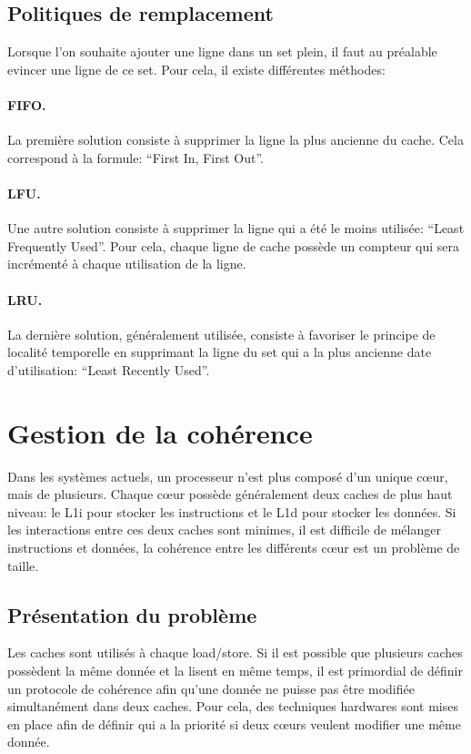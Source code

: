 \documentclass[a4paper]{article}
\begin{document}
\subsection{Politiques de remplacement}
\indent Lorsque l'on souhaite ajouter une ligne dans un set plein, il faut au préalable evincer une ligne de ce set. Pour cela, il existe différentes méthodes:

\paragraph{FIFO.} La première solution consiste à supprimer la ligne la plus ancienne du cache. Cela correspond à la formule: ``First In, First Out''.

\paragraph{LFU.} Une autre solution consiste à supprimer la ligne qui a été le moins utilisée: ``Least Frequently Used''. Pour cela, chaque ligne de cache possède un compteur qui sera incrémenté à chaque utilisation de la ligne. 

\paragraph{LRU.} La dernière solution, généralement utilisée, consiste à favoriser le principe de localité temporelle en supprimant la ligne du set qui a la plus ancienne date d'utilisation: ``Least Recently Used''.

\newpage
\section{Gestion de la cohérence}
\indent Dans les systèmes actuels, un processeur n'est plus composé d'un unique c{\oe}ur, mais de plusieurs. Chaque c{\oe}ur possède généralement deux caches de plus haut niveau: le L1i pour stocker les instructions et le L1d pour stocker les données. Si les interactions entre ces deux caches sont minimes, il est difficile de mélanger instructions et données, la cohérence entre les différents c{\oe}ur est un problème de taille.

\subsection{Présentation du problème}
\indent Les caches sont utilisés à chaque load/store. Si il est possible que plusieurs caches possèdent la même donnée et la lisent en même temps, il est primordial de définir un protocole de cohérence afin qu'une donnée ne puisse pas être modifiée simultanément dans deux caches. Pour cela, des techniques hardwares sont mises en place afin de définir qui a la priorité si deux c{\oe}urs veulent modifier une même donnée. \\
\end{document}

